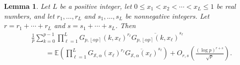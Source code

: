 \documentclass[reqno]{amsart}
\newtheorem{lemma}[theorem]{Lemma}
\numberwithin{equation}{section}
\numberwithin{table}{section}
\numberwithin{figure}{section}
\newcommand{\round}[1]{\left\lfloor#1\right\rceil}
\begin{document}
\begin{lemma}\label{lemMoments}
Let $L$ be a positive integer, let $0\leq x_1<x_2<\cdots<x_L\leq1$ be real numbers, and let $r_1,\ldots, r_L$ and $s_1,\ldots,s_L$ be nonnegative integers.
Let $r=r_1+\cdots+r_L$ and $s=s_1+\cdots+s_L$.
Then
\begin{equation*}
\begin{split}
&\frac{1}{p} \sum_{k=0}^{p-1} \prod_{\ell=1}^L G_{p,\round{\alpha p}}(k, x_\ell)^{r_\ell} \overline{G_{p,\round{\alpha p}}(k, x_\ell)}^{s_\ell}\\
&\qquad= \mathbb{E}\left(\prod_{\ell=1}^L G_{\mathbb{X},\alpha}(x_\ell)^{r_\ell} \overline{G_{\mathbb{X},\alpha}(x_\ell)}^{s_\ell}\right) + O_{r,s}\left(\frac{(\log p)^{r+s}}{\sqrt{p}}\right).
\end{split}
\end{equation*}
\end{lemma}
\end{document}
